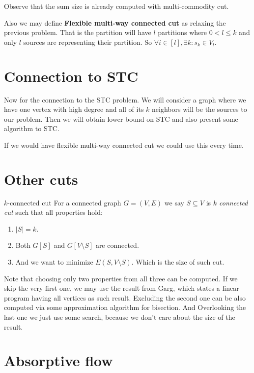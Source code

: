 \documentclass{article}
\begin{document}
	\noindent Observe that the sum size is already computed with multi-commodity cut.
	
	\noindent Also we may define \textbf{Flexible multi-way connected cut} as relaxing the previous problem. That is the partition will have $l$ partitions where $0 < l \leq k$ and only $l$ sources are representing their partition. So $\forall i \in [l] , \exists k : s_k \in V_l$.
	
	\section{Connection to STC}
	
	Now for the connection to the STC problem. We will consider a graph where we have one vertex with high degree and all of its $k$ neighbors will be the sources to our problem. Then we will obtain lower bound on STC and also present some algorithm to STC.
	
	If we would have flexible multi-way connected cut we could use this every time.
	
	\section{Other cuts}
	
	\begin{defn}{$k$-connected cut}
		For a connected graph $G = (V,E)$ we say $S \subseteq V$ is \textit{$k$ connected cut} such that all properties hold:
		
		\begin{enumerate}
			\item $|S| = k$.
			\item Both $G[S]$ and $G[V \setminus S]$ are connected.
			\item And we want to minimize $E(S, V \setminus S)$. Which is the size of such cut.
		\end{enumerate}
	\end{defn}
	
	\noindent Note that choosing only two properties from all three can be computed. If we skip the very first one, we may use the result from Garg, which states a linear program having all vertices as such result. Excluding the second one can be also computed via some approximation algorithm for bisection. And Overlooking the last one we just use some search, because we don't care about the size of the result.
	
	\section{Absorptive flow}
	
\end{document}
